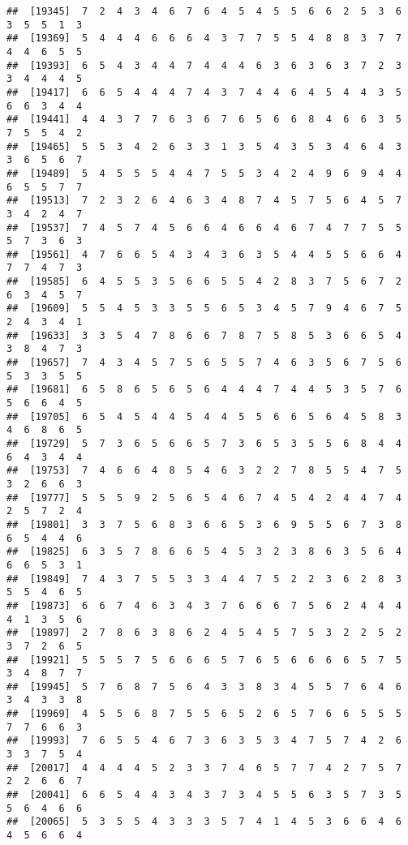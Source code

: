 \documentclass[
]{book}
\begin{document}
\begin{verbatim}
##  [19345]  7  2  4  3  4  6  7  6  4  5  4  5  5  6  6  2  5  3  6  3  5  5  1  3
##  [19369]  5  4  4  4  6  6  6  4  3  7  7  5  5  4  8  8  3  7  7  4  4  6  5  5
##  [19393]  6  5  4  3  4  4  7  4  4  4  6  3  6  3  6  3  7  2  3  3  4  4  4  5
##  [19417]  6  6  5  4  4  4  7  4  3  7  4  4  6  4  5  4  4  3  5  6  6  3  4  4
##  [19441]  4  4  3  7  7  6  3  6  7  6  5  6  6  8  4  6  6  3  5  7  5  5  4  2
##  [19465]  5  5  3  4  2  6  3  3  1  3  5  4  3  5  3  4  6  4  3  3  6  5  6  7
##  [19489]  5  4  5  5  5  4  4  7  5  5  3  4  2  4  9  6  9  4  4  6  5  5  7  7
##  [19513]  7  2  3  2  6  4  6  3  4  8  7  4  5  7  5  6  4  5  7  3  4  2  4  7
##  [19537]  7  4  5  7  4  5  6  6  4  6  6  4  6  7  4  7  7  5  5  5  7  3  6  3
##  [19561]  4  7  6  6  5  4  3  4  3  6  3  5  4  4  5  5  6  6  4  7  7  4  7  3
##  [19585]  6  4  5  5  3  5  6  6  5  5  4  2  8  3  7  5  6  7  2  6  3  4  5  7
##  [19609]  5  5  4  5  3  3  5  5  6  5  3  4  5  7  9  4  6  7  5  2  4  3  4  1
##  [19633]  3  3  5  4  7  8  6  6  7  8  7  5  8  5  3  6  6  5  4  3  8  4  7  3
##  [19657]  7  4  3  4  5  7  5  6  5  5  7  4  6  3  5  6  7  5  6  5  3  3  5  5
##  [19681]  6  5  8  6  5  6  5  6  4  4  4  7  4  4  5  3  5  7  6  5  6  6  4  5
##  [19705]  6  5  4  5  4  4  5  4  4  5  5  6  6  5  6  4  5  8  3  4  6  8  6  5
##  [19729]  5  7  3  6  5  6  6  5  7  3  6  5  3  5  5  6  8  4  4  6  4  3  4  4
##  [19753]  7  4  6  6  4  8  5  4  6  3  2  2  7  8  5  5  4  7  5  3  2  6  6  3
##  [19777]  5  5  5  9  2  5  6  5  4  6  7  4  5  4  2  4  4  7  4  2  5  7  2  4
##  [19801]  3  3  7  5  6  8  3  6  6  5  3  6  9  5  5  6  7  3  8  6  5  4  4  6
##  [19825]  6  3  5  7  8  6  6  5  4  5  3  2  3  8  6  3  5  6  4  6  6  5  3  1
##  [19849]  7  4  3  7  5  5  3  3  4  4  7  5  2  2  3  6  2  8  3  5  5  4  6  5
##  [19873]  6  6  7  4  6  3  4  3  7  6  6  6  7  5  6  2  4  4  4  4  1  3  5  6
##  [19897]  2  7  8  6  3  8  6  2  4  5  4  5  7  5  3  2  2  5  2  3  7  2  6  5
##  [19921]  5  5  5  7  5  6  6  6  5  7  6  5  6  6  6  6  5  7  5  3  4  8  7  7
##  [19945]  5  7  6  8  7  5  6  4  3  3  8  3  4  5  5  7  6  4  6  3  4  3  3  8
##  [19969]  4  5  5  6  8  7  5  5  6  5  2  6  5  7  6  6  5  5  5  7  7  6  6  3
##  [19993]  7  6  5  5  4  6  7  3  6  3  5  3  4  7  5  7  4  2  6  3  3  7  5  4
##  [20017]  4  4  4  4  5  2  3  3  7  4  6  5  7  7  4  2  7  5  7  2  2  6  6  7
##  [20041]  6  6  5  4  4  3  4  3  7  3  4  5  5  6  3  5  7  3  5  5  6  4  6  6
##  [20065]  5  3  5  5  4  3  3  3  5  7  4  1  4  5  3  6  6  4  6  4  5  6  6  4

\end{verbatim}
\end{document}
